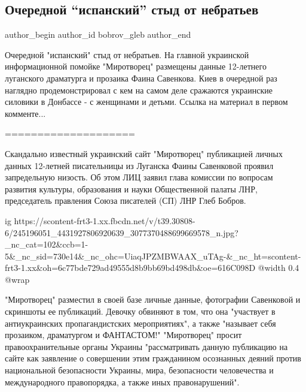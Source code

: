 
 
 
 
 
 
\subsection{Очередной \enquote{испанский} стыд от небратьев}
\label{sec:13_10_2021.fb.bobrov_gleb.1.savenkova_mirotvorec}
 
\ifcmt
 author_begin
   author_id bobrov_gleb
 author_end
\fi

Очередной "испанский" стыд от небратьев. На главной украинской информационной
помойке "Миротворец" размещены данные 12-летнего луганского драматурга и
прозаика Фаина Савенкова. Киев в очередной раз наглядно продемонстрировал с кем
на самом деле сражаются украинские силовики в Донбассе - с женщинами и детьми.
Ссылка на материал в первом комменте...

====================

Скандально известный украинский сайт "Миротворец" публикацией личных данных
12-летней писательницы из Луганска Фаины Савенковой проявил запредельную
низость. Об этом ЛИЦ заявил глава комиссии по вопросам развития культуры,
образования и науки Общественной палаты ЛНР, председатель правления Союза
писателей (СП) ЛНР Глеб Бобров.

\ifcmt
  ig https://scontent-frt3-1.xx.fbcdn.net/v/t39.30808-6/245196051_4431927806920639_3077370488699669578_n.jpg?_nc_cat=102&ccb=1-5&_nc_sid=730e14&_nc_ohc=UiaqJPZMBWAAX_uTAg-&_nc_ht=scontent-frt3-1.xx&oh=6c77bde729ad49555d8b9bb69bd498db&oe=616C098D
  @width 0.4
  @wrap 
\fi

"Миротворец" разместил в своей базе личные данные, фотографии Савенковой и
скриншоты ее публикаций. Девочку обвиняют в том, что она "участвует в
антиукраинских пропагандистских мероприятиях", а также "называет себя
прозаиком, драматургом и ФАНТАСТОМ!" "Миротворец" просит правоохранительные
органы Украины "рассматривать данную публикацию на сайте как заявление о
совершении этим гражданином осознанных деяний против национальной безопасности
Украины, мира, безопасности человечества и международного правопорядка, а также
иных правонарушений".

